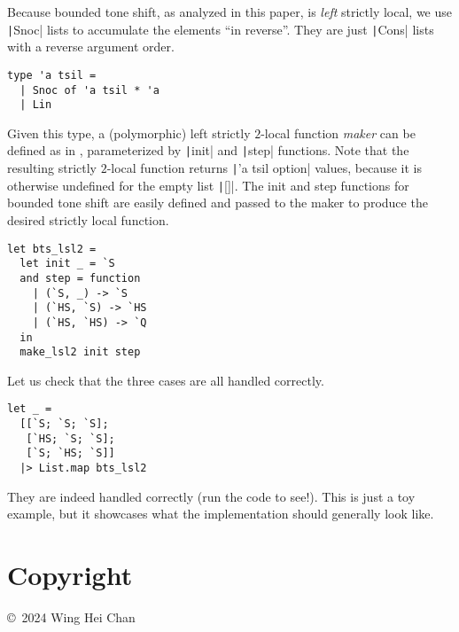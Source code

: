 \documentclass[11pt]{article}
\theoremstyle{definition}
\theoremstyle{plain}
\begin{document}
Because bounded tone shift, as analyzed in this paper, is \emph{left}
strictly local, we use \texttt|Snoc| lists to accumulate
the elements \enquote{in reverse}.  They are just
\texttt|Cons| lists with a reverse argument order.
%
\begin{verbatim}
type 'a tsil =
  | Snoc of 'a tsil * 'a
  | Lin
\end{verbatim}
%
Given this type, a (polymorphic) left strictly \(2\)-local function
\emph{maker} can be defined as in , parameterized
by \texttt|init| and \texttt|step| functions.
Note that the resulting strictly \(2\)-local function returns
\texttt|'a tsil option| values, because it is otherwise
undefined for the empty list \texttt|[]|.  The init and
step functions for bounded tone shift are easily defined and passed to
the maker to produce the desired strictly local function.
%
\begin{verbatim}
let bts_lsl2 =
  let init _ = `S
  and step = function
    | (`S, _) -> `S
    | (`HS, `S) -> `HS
    | (`HS, `HS) -> `Q
  in
  make_lsl2 init step
\end{verbatim}
%
Let us check that the three cases are all handled correctly.
%
\begin{verbatim}
let _ =
  [[`S; `S; `S];
   [`HS; `S; `S];
   [`S; `HS; `S]]
  |> List.map bts_lsl2
\end{verbatim}
%
They are indeed handled correctly (run the code to see!).  This is
just a toy example, but it showcases what the implementation should
generally look like.

\section{Copyright}
\begin{minipage}[b]{1.0\linewidth}
  \copyright\ 2024 Wing Hei Chan

  \doclicenseLongText
  \doclicenseImage
\end{minipage}
\end{document}
